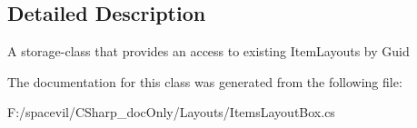 \subsection{Detailed Description}
A storage-\/class that provides an access to existing Item\+Layouts by Guid 



The documentation for this class was generated from the following file\+:\begin{DoxyCompactItemize}
\item 
F\+:/spacevil/\+C\+Sharp\+\_\+doc\+Only/\+Layouts/Items\+Layout\+Box.\+cs\end{DoxyCompactItemize}
